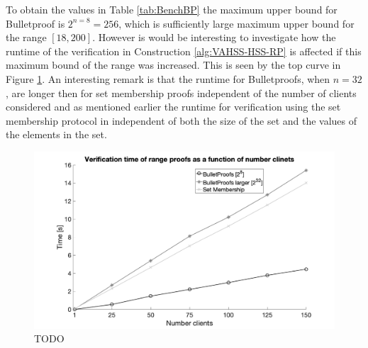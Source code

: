 To obtain the values in Table \ref{tab:BenchBP} the maximum upper bound for Bulletproof is $2^{n=8}=256$, which  is sufficiently large maximum upper bound  for the range $[18,200]$. However is would be interesting to investigate how the runtime of the verification in Construction \ref{alg:VAHSS-HSS-RP} is affected if this maximum bound of the range was increased. This is seen by the top curve in Figure \ref{fig:NrClients}. 
 An interesting remark is that  the runtime for Bulletproofs, when $n=32$, are longer then for set membership proofs independent of the number of clients considered and as mentioned earlier the runtime for verification using the set membership protocol in independent of both the size of the set and the values of the elements in the set.
 \begin{figure}[]
\caption{TODO}
\label{fig:NrClients}
\includegraphics[width=\linewidth]{./figure/verification_nrClients.png}
\end{figure}
